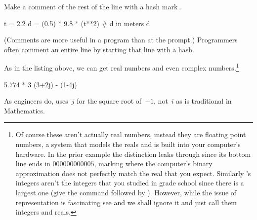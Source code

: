 Make a comment of the rest of the line with a hash mark \inlinecode{\#}.
\begin{pythonoutput}
t = 2.2
d = (0.5) * 9.8 * (t**2)  # d in meters
d
\end{pythonoutput}
\noindent (Comments are more useful in a program than at the prompt.)
Programmers often comment an entire line by starting 
that line with a hash. 

As in the listing above, we can get real 
numbers 
and even complex numbers.\footnote{Of course these aren't actually 
real numbers, instead they are floating point numbers, a system that
models the reals and is built into your computer's hardware.
In the prior example the distinction leaks through
since its bottom line ends in $000000000005$, marking where
the computer's binary approximation does not perfectly match
the real that you expect.
Similarly \protect\python's integers aren't the integers that you studied
in grade school since there is a largest one (give \python{} the 
command \protect{} followed by 
\protect{}). 
However, while the issue of representation is fascinating\protect\Dash
see \protect\cite{PythonTeam12a} and \protect\cite{Goldberg91}\protect\Dash
we shall ignore it and just call them integers and reals.}
\begin{pythonoutput}
5.774 * 3
(3+2j) - (1-4j)
\end{pythonoutput}
\noindent As engineers do, \python{} uses~$j$ for the square
root of~$-1$, not~$i$ as is traditional in Mathematics.

